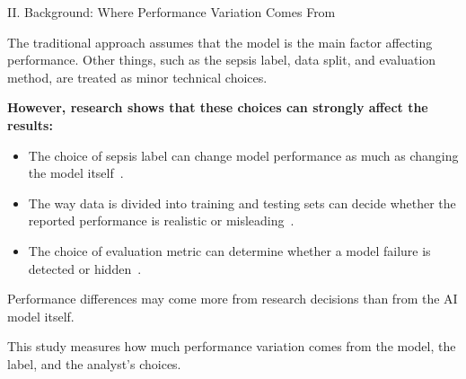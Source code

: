 \begin{frame}{II. Background: Where Performance Variation Comes From}
{\small The traditional approach assumes that the model is the main factor
affecting performance. Other things, such as the sepsis label, data split,
and evaluation method, are treated as minor technical choices.\par}

\vspace{4pt}
\textbf{However, research shows that these choices can strongly affect the
results:}
\begin{itemize}\itemsep1pt\small
  \item The choice of sepsis label can change model performance as much as
        changing the model itself~\cite{cohen2024subtle}.
  \item The way data is divided into training and testing sets can decide
        whether the reported performance is realistic or
        misleading~\cite{guo2022temporal}.
  \item The choice of evaluation metric can determine whether a model failure
        is detected or hidden~\cite{wang2025srpm}.
\end{itemize}

\vspace{4pt}
\begin{alertblock}{}
  \centering Performance differences may come more from research decisions
  than from the AI model itself.
\end{alertblock}

\vspace{4pt}
{\small This study measures how much performance variation comes from the
model, the label, and the analyst's choices.\par}
\end{frame}
